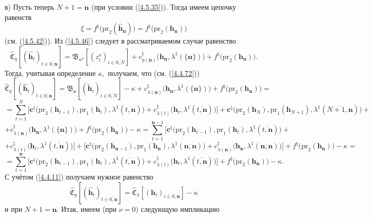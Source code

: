 \documentclass[12pt]{report}
\newcommand{\bfn}{\begin{equation}}
\newcommand{\efn}{\end{equation}}
\newcommand{\ov}{\overline}
\newcommand{\la}{\lambda}
\newcommand{\al}{\alpha}
\begin{document}
{{в) Пусть теперь $N+1 = \mathbf{n}$ (при  условии (\ref{4.5.35})). Тогда имеем цепочку равенств
\bfn\label{4.5.50}
\xi = f^\natural\bigl(\mathrm{pr}_2(\hat{\mathbf{h}}_\mathbf{n})\bigl) =
f^\natural\bigl(\mathrm{pr}_2(\mathbf{h}_\mathbf{n})\bigl)
\efn
(см. (\ref{4.5.42})). Из (\ref{4.5.46}) следует в рассматриваемом случае равенство
$$\widehat{\mathfrak{C}}_\eta[(\hat{\mathbf{h}}_t)_{t\in\ov{0,\mathbf{n}}}] =
\mathfrak{B}_{\al^o}[(z_i^o)_{i\in\ov{0,N}}] +
c_{\eta(\mathbf{n})}^\natural\bigl(\mathbf{h}_\mathbf{n},\la^1(\{\mathbf{n}\})\bigl) +
f^\natural\bigl(\mathrm{pr}_2(\mathbf{h}_\mathbf{n})\bigl).
$$
Тогда, учитывая определение $\kappa,$ получаем, что (см. (\ref{4.4.72}))
$$
\widehat{\mathfrak{C}}_\eta[(\hat{\mathbf{h}}_t)_{t\in\ov{0,\mathbf{n}}}] =
\mathfrak{B}_\mathbf{e}[(\tilde{\mathbf{h}}_i)_{i\in\ov{0,N}}] - \kappa +
c_{\la(\mathbf{n})}^\natural\bigl(\mathbf{h}_\mathbf{n},\la^1(\{\mathbf{n}\})\bigl) +
f^\natural\bigl(\mathrm{pr}_2(\mathbf{h}_\mathbf{n})\bigl) =
$$
$$
= \sum\limits_{t=1}^N\bigl[\mathbf{c}^\natural\bigl(\mathrm{pr}_2(\mathbf{h}_{t-1}),\mathrm{pr}_1
(\mathbf{h}_t), \la^1(\ov{t,\mathbf{n}})\bigl) + c_{\la(t)}^\natural\bigl(\mathbf{h}_t,
\la^1(\ov{t,\mathbf{n}})\bigl)\bigl] + \mathbf{c}^\natural\bigl(\mathrm{pr}_2(\mathbf{h}_N),
\mathrm{pr}_1(\mathbf{h}_{N+1}),
\la^1(\ov{N+1,\mathbf{n}})\bigl) +
$$
$$
+ c_{\la(\mathbf{n})}^\natural\bigl(\mathbf{h}_\mathbf{n},\la^1 (\{\mathbf{n}\})\bigl) +
f^\natural\bigl(\mathrm{pr}_2(\mathbf{h}_\mathbf{n})\bigl) -\kappa =
\sum\limits_{t=1}^{\mathbf{n}-1}\bigl[\mathbf{c}^\natural\bigl(\mathrm{pr}_2(\mathbf{h}_{t-1}),
\mathrm{pr}_1(\mathbf{h}_t), \la^1(\ov{t,\mathbf{n}})\bigl) +
$$
$$
+ c_{\la(t)}^\natural\bigl(\mathbf{h}_t,\la^1(\ov{t,\mathbf{n}})\bigl)\bigl] +
\bigl[\mathbf{c}^\natural\bigl(\mathrm{pr}_2(\mathbf{h}_{\mathbf{n}-1}),\mathrm{pr}_1
(\mathbf{h}_\mathbf{n}),\la^1(\ov{\mathbf{n},\mathbf{n}})\bigl) +
c_{\la(\mathbf{n})}^\natural\bigl(\mathbf{h}_\mathbf{n},\la^1(\ov{\mathbf{n},\mathbf{n}})\bigl)\bigl] +
f^\natural\bigl(\mathrm{pr}_2(\mathbf{h}_\mathbf{n})\bigl) - \kappa =
$$
$$
= \sum\limits_{t=1}^\mathbf{n}\bigl[\mathbf{c}^\natural\bigl(\mathrm{pr}_2(\mathbf{h}_{t-1}),
\mathrm{pr}_1(\mathbf{h}_t),\la^1(\ov{t,\mathbf{n}})\bigl) +
c_{\la(t)}^\natural\bigl(\mathbf{h}_t,\la^1(\ov{t,\mathbf{n}})\bigl)\bigl]
+f^\natural\bigl(\mathrm{pr}_2(\mathbf{h}_\mathbf{n})\bigl) - \kappa.
$$
С учётом (\ref{4.4.11}) получаем нужное равенство
$$
\widehat{\mathfrak{C}}_\eta[(\hat{\mathbf{h}}_t)_{t\in\ov{0,\mathbf{n}}}] =
\widehat{\mathfrak{C}}_\la[(\mathbf{h}_i)_{i\in\ov{0,\mathbf{n}}}] - \kappa
$$
и при $N+1 = \mathbf{n}.$ Итак, имеем (при $\nu = 0)$ следующую импликацию
}}
\end{document}
